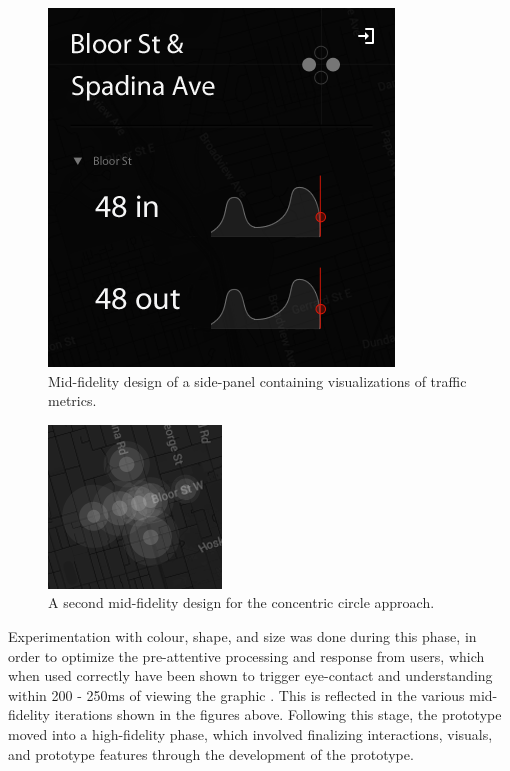 \documentclass{article}
\begin{document}
\begin{figure}[htbp!]
  \begin{centering}
    \includegraphics[scale=1]{figures/side-panel.png}
    \caption{Mid-fidelity design of a side-panel containing visualizations of traffic metrics.}
    \label{fig:side-panel}
  \end{centering}
\end{figure}

\begin{figure}[htbp!]
  \begin{centering}
    \includegraphics[scale=1]{figures/dots-2.png}
    \caption{A second mid-fidelity design for the concentric circle approach.}
    \label{fig:dots-2}
  \end{centering}
\end{figure}

Experimentation with colour, shape, and size was done during this phase, in order to optimize the pre-attentive processing and response from users, which when used correctly have been shown to trigger eye-contact and understanding within 200 - 250ms of viewing the graphic \cite{Healey93} \cite{Healey96}.
This is reflected in the various mid-fidelity iterations shown in the figures above.
Following this stage, the prototype moved into a high-fidelity phase, which involved finalizing interactions, visuals, and prototype features through the development of the prototype.\\
\end{document}
